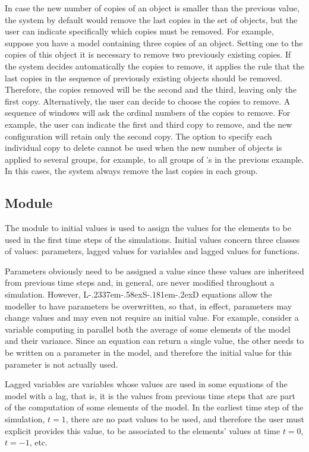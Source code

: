 \documentclass [11pt,a4paper] {book}
\def\LsD{{L\kern-.2337em\lower-.58ex\hbox{S}\kern-.181em\lower-.2ex\hbox{D}}\xspace}
\begin{document}
In case the new number of copies of an object is smaller than the previous value, the system by default would remove the last copies in the set of objects, but the user can indicate specifically which copies must be removed. For example, suppose you have a model containing three copies of an object. Setting one to the copies of this object it is necessary to remove two previously existing copies. If the system decides automatically the copies to remove, it applies the rule that the last copies in the sequence of previously existing objects should be removed. Therefore, the copies removed will be the second and the third, leaving only the first copy. Alternatively, the user can decide to choose the copies to remove. A sequence of windows will ask the ordinal numbers of the copies to remove. For example, the user can indicate the first and third copy to remove, and the new configuration will retain only the second copy. The option to specify each individual copy to delete cannot be used when the new number of objects is applied to several groups, for example, to all groups of 's in the previous example. In this cases, the system always remove the last copies in each group.

\subsection{Module }

The module to initial values is used to assign the values for the elements to be used in the first time steps of the simulations. Initial values concern three classes of values: parameters, lagged values for variables and lagged values for functions. 

Parameters obviously need to be assigned a value since these values are inheriteed from previous time steps and, in general, are never modified throughout a simulation. However, \LsD equations allow the modeller to have parameters be overwritten, so that, in effect, parameters may change values and may even not require an initial value. For example, consider a variable computing in parallel both the average of some elements of the model and their variance. Since an equation can return a single value, the other needs to be written on a parameter in the model, and therefore the initial value for this parameter is not actually used.

Lagged variables are variables whose values are used in some equations of the model with a lag, that is, it is the values from previous time steps that are part of the computation of some elements of the model. In the earliest time step of the simulation, $t=1$, there are no past values to be used, and therefore the user must explicit provides this value, to be associated to the elements' values at time $t=0$, $t=-1$, etc.
\end{document}
